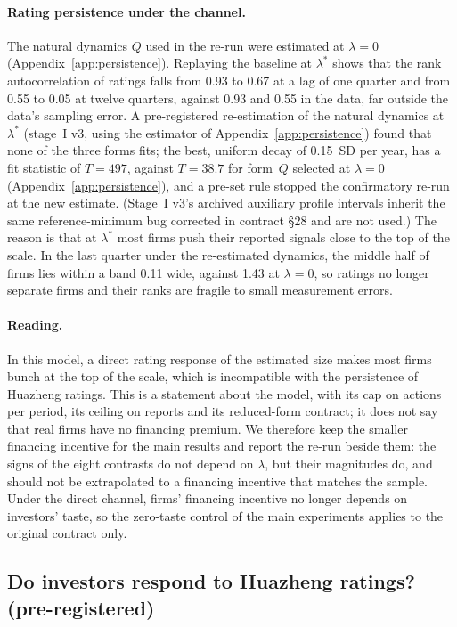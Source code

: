 \documentclass[11pt]{article}
\begin{document}
\paragraph{Rating persistence under the channel.} The natural dynamics $Q$ used in the re-run were estimated at $\lambda = 0$ (Appendix~\ref{app:persistence}). Replaying the baseline at $\lambda^*$ shows that the rank autocorrelation of ratings falls from 0.93 to 0.67 at a lag of one quarter and from 0.55 to 0.05 at twelve quarters, against 0.93 and 0.55 in the data, far outside the data's sampling error. A pre-registered re-estimation of the natural dynamics at $\lambda^*$ (stage~I v3, using the estimator of Appendix~\ref{app:persistence}) found that none of the three forms fits; the best, uniform decay of 0.15~SD per year, has a fit statistic of $T = 497$, against $T = 38.7$ for form~$Q$ selected at $\lambda = 0$ (Appendix~\ref{app:persistence}), and a pre-set rule stopped the confirmatory re-run at the new estimate. (Stage~I v3's archived auxiliary profile intervals inherit the same reference-minimum bug corrected in contract \S28 and are not used.) The reason is that at $\lambda^*$ most firms push their reported signals close to the top of the scale. In the last quarter under the re-estimated dynamics, the middle half of firms lies within a band 0.11 wide, against 1.43 at $\lambda = 0$, so ratings no longer separate firms and their ranks are fragile to small measurement errors.

\paragraph{Reading.} In this model, a direct rating response of the estimated size makes most firms bunch at the top of the scale, which is incompatible with the persistence of Huazheng ratings. This is a statement about the model, with its cap on actions per period, its ceiling on reports and its reduced-form contract; it does not say that real firms have no financing premium. We therefore keep the smaller financing incentive for the main results and report the re-run beside them: the signs of the eight contrasts do not depend on $\lambda$, but their magnitudes do, and should not be extrapolated to a financing incentive that matches the sample. Under the direct channel, firms' financing incentive no longer depends on investors' taste, so the zero-taste control of the main experiments applies to the original contract only.

\subsection{Do investors respond to Huazheng ratings? (pre-registered)}\label{app:investors}
\end{document}

